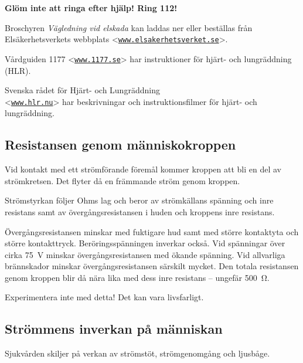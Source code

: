 \textbf{Glöm inte att ringa efter hjälp! Ring 112!}

Broschyren \emph{Vägledning vid elskada} kan laddas ner eller beställas från
Elsäkerhetsverkets webbplats
<\href{https://www.elsakerhetsverket.se}{\texttt{www.elsakerhetsverket.se}}>.

Vårdguiden 1177 <\href{https://www.1177.se}{\texttt{www.1177.se}}> har
instruktioner för hjärt- och lungräddning (HLR).

Svenska rådet för Hjärt- och Lungräddning \\
<\href{https://www.hlr.nu}{\texttt{www.hlr.nu}}> har beskrivningar och
instruktionsfilmer för hjärt- och lungräddning.

\subsection{Resistansen genom människo\-kroppen}

Vid kontakt med ett strömförande föremål kommer kroppen att bli en del
av strömkretsen. Det flyter då en främmande ström genom kroppen.

Strömstyrkan följer Ohms lag och beror av strömkällans spänning och inre
resistans samt av övergångsresistansen i huden och kroppens inre resistans.

Övergångsresistansen minskar med fuktigare hud samt med större kontaktyta och
större kontakttryck. Beröringsspänningen inverkar också.
Vid spänningar över cirka \qty{75}{\volt} minskar övergångsresistansen med
ökande spänning.
Vid allvarliga brännskador minskar övergångsresistansen särskilt mycket.
Den totala resistansen genom kroppen blir då nära lika med dess inre resistans
-- ungefär \qty{500}{\ohm}.

\begin{center}
\begin{minipage}{0.19\columnwidth}
\Huge{\selectfont{}\relax}
\end{minipage}
\begin{minipage}{0.7\columnwidth}
  Experimentera inte med detta! Det kan vara livsfarligt.
\end{minipage}
\end{center}


\subsection{Strömmens inverkan på människan}

Sjukvården skiljer på verkan av strömstöt, strömgenomgång och ljusbåge.

